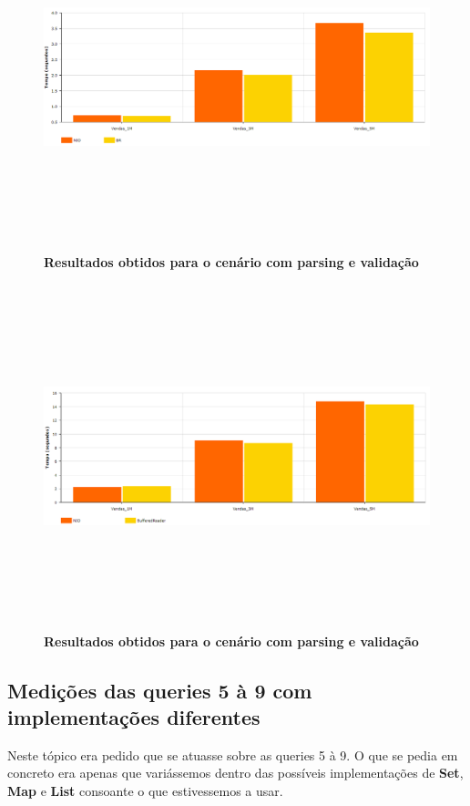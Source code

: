 \documentclass[11pt]{article}
\begin{document}
\begin{figure}[H]
    \centering
    \includegraphics[width=\textwidth,height=10cm]{images/nio_vs_br_pv.png}
    \caption{\textbf{Resultados obtidos para o cenário com parsing e validação}}
\end{figure}
\begin{figure}[H]
    \centering
    \includegraphics[width=\textwidth,height=10cm]{images/nio_vs_br_full_parse.png}
    \caption{\textbf{Resultados obtidos para o cenário com parsing e validação}}
\end{figure}

\newpage

\subsection{Medições das queries 5 à 9 com implementações diferentes}
Neste tópico era pedido que se atuasse sobre as queries 5 à 9. O que se pedia em concreto era apenas que variássemos dentro das possíveis implementações de \textbf{Set}, \textbf{Map} e \textbf{List} consoante o que estivessemos a usar. 
\end{document}
